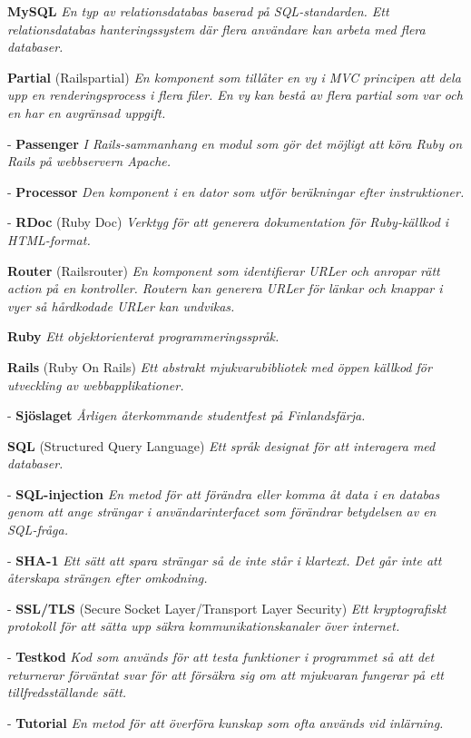\documentclass[a4paper, twoside, 11pt, titlepage]{article}
\begin{document}
	\textbf{MySQL} \emph{En typ av relationsdatabas baserad på SQL-standarden. Ett relationsdatabas hanteringssystem där flera användare kan arbeta med flera databaser.}

	\textbf{Partial} (Railspartial) \emph{En komponent som tillåter en vy i MVC principen att dela upp en renderingsprocess i flera filer. En vy kan bestå av flera partial som var och en har en avgränsad uppgift.}

	- \textbf{Passenger} \emph{I Rails-sammanhang en modul som gör det möjligt att köra Ruby on Rails på webbservern Apache.}

	- \textbf{Processor} \emph{Den komponent i en dator som utför beräkningar efter instruktioner.}

	- \textbf{RDoc} (Ruby Doc) \emph{Verktyg för att generera dokumentation för Ruby-källkod i HTML-format.}

	\textbf{Router} (Railsrouter) \emph{En komponent som identifierar URLer och anropar rätt action på en kontroller. Routern kan generera URLer för länkar och knappar i vyer så hårdkodade URLer kan undvikas.}

	\textbf{Ruby} \emph{Ett objektorienterat programmeringsspråk.}

	\textbf{Rails} (Ruby On Rails) \emph{Ett abstrakt mjukvarubibliotek med öppen källkod för utveckling av webbapplikationer.}

	- \textbf{Sjöslaget} \emph{Årligen återkommande studentfest på Finlandsfärja.}

	\textbf{SQL} (Structured Query Language) \emph{Ett språk designat för att interagera med databaser.}

	- \textbf{SQL-injection} \emph{En metod för att förändra eller komma åt data i en databas genom att ange strängar i användarinterfacet som förändrar betydelsen av en SQL-fråga.}

	- \textbf{SHA-1} \emph{Ett sätt att spara strängar så de inte står i klartext. Det går inte att återskapa strängen efter omkodning.}

	- \textbf{SSL/TLS} (Secure Socket Layer/Transport Layer Security) \emph{Ett kryptografiskt protokoll för att sätta upp säkra kommunikationskanaler över internet.}

	- \textbf{Testkod} \emph{Kod som används för att testa funktioner i programmet så att det returnerar förväntat svar för att försäkra sig om att mjukvaran fungerar på ett tillfredsställande sätt.}

	- \textbf{Tutorial} \emph{En metod för att överföra kunskap som ofta används vid inlärning.}
\end{document}
